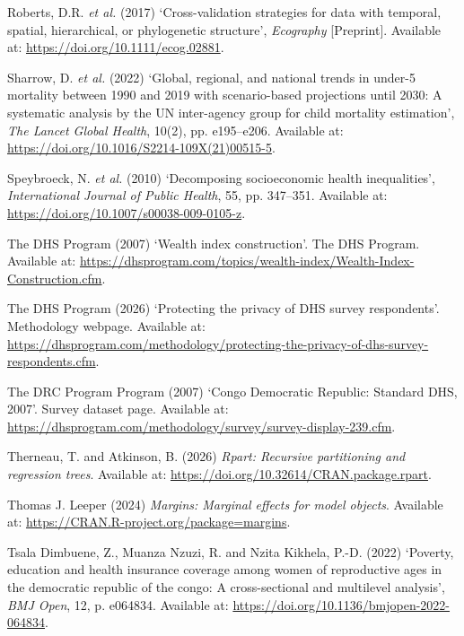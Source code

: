 \documentclass[
  11pt,
  a4paper,
]{article}
\newlength{\cslhangindent}
\newenvironment{CSLReferences}[2] %
 {\begin{list}{}{%
  \setlength{\itemindent}{0pt}
  \setlength{\leftmargin}{0pt}
  \setlength{\parsep}{0pt}
  \ifodd #1
   \setlength{\leftmargin}{\cslhangindent}
   \setlength{\itemindent}{-1\cslhangindent}
  \fi
  \setlength{\itemsep}{#2\baselineskip}}}
 {\end{list}}
\begin{document}
\begin{CSLReferences}{0}{1}
Roberts, D.R. \emph{et al.} (2017) {`Cross-validation strategies for
data with temporal, spatial, hierarchical, or phylogenetic structure'},
\emph{Ecography} {[}Preprint{]}. Available at:
\url{https://doi.org/10.1111/ecog.02881}.

{Sharrow, D. \emph{et al.}} (2022) {`Global, regional, and national
trends in under-5 mortality between 1990 and 2019 with scenario-based
projections until 2030: A systematic analysis by the UN inter-agency
group for child mortality estimation'}, \emph{The Lancet Global Health},
10(2), pp. e195--e206. Available at:
\url{https://doi.org/10.1016/S2214-109X(21)00515-5}.

Speybroeck, N. \emph{et al.} (2010) {`Decomposing socioeconomic health
inequalities'}, \emph{International Journal of Public Health}, 55, pp.
347--351. Available at: \url{https://doi.org/10.1007/s00038-009-0105-z}.

The DHS Program (2007) {`Wealth index construction'}. The DHS Program.
Available at:
\url{https://dhsprogram.com/topics/wealth-index/Wealth-Index-Construction.cfm}.

The DHS Program (2026) {`Protecting the privacy of DHS survey
respondents'}. Methodology webpage. Available at:
\url{https://dhsprogram.com/methodology/protecting-the-privacy-of-dhs-survey-respondents.cfm}.

The DRC Program Program (2007) {`{Congo Democratic Republic: Standard
DHS, 2007}'}. Survey dataset page. Available at:
\url{https://dhsprogram.com/methodology/survey/survey-display-239.cfm}.

Therneau, T. and Atkinson, B. (2026) \emph{Rpart: Recursive partitioning
and regression trees}. Available at:
\url{https://doi.org/10.32614/CRAN.package.rpart}.

Thomas J. Leeper (2024) \emph{Margins: Marginal effects for model
objects}. Available at:
\url{https://CRAN.R-project.org/package=margins}.

Tsala Dimbuene, Z., Muanza Nzuzi, R. and Nzita Kikhela, P.-D. (2022)
{`Poverty, education and health insurance coverage among women of
reproductive ages in the democratic republic of the congo: A
cross-sectional and multilevel analysis'}, \emph{BMJ Open}, 12, p.
e064834. Available at:
\url{https://doi.org/10.1136/bmjopen-2022-064834}.


\end{CSLReferences}
\end{document}
